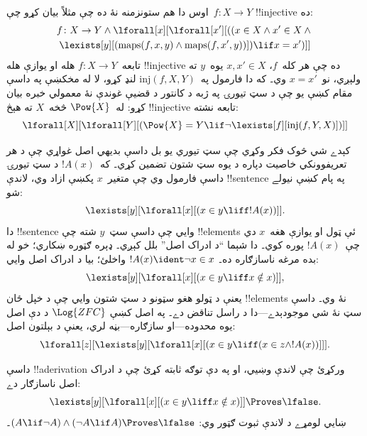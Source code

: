 \documentclass[../../../include/open-logic-section]{subfiles}
\begin{document}
اوس دا هم ستونزمنه نۀ ده چې مثلاً بيان کړو چې~$f\colon X \to Y$
!!{injective} ده:
\begin{multline*}
 f \colon X \to Y \land \lforall[x][\lforall[x'][((x \in X \land x' \in
     X \land {} \\
 \lexists[y][(\mathrm{maps}(f, x, y) \land \mathrm{maps}(f,
        x', y))]) \lif x = x')]]
\end{multline*}
تابعه~$f\colon X \to Y$ هله او يوازې هله !!{injective} ده چې هر
کله~$f$، $x, x' \in X$ يوه~$y$ ته ولېږي، نو~$x = x'$ وي۔ که دا
فارمول په~$\mathrm{inj}(f, X, Y)$ لنډ کړو، لا له مخکښې په داسې مقام
کښې يو چې د سټ تيورۍ په ژبه د کانتور د قضيې غوندې نۀ معمولي خبره
بيان کړو: له~$\Pow{X}$ څخه~$X$ ته هېڅ !!{injective} تابعه نشته:
\[
\lforall[X][\lforall[Y][(\Pow{X} = Y \lif
    \lnot\lexists[f][\mathrm{inj}(f, Y, X)])]]
\]

کېدے شي څوک فکر وکړي چې سټ تيوري يو بل داسې بديهي اصل غواړي چې د هر
تعريفوونکي خاصيت دپاره د يوه سټ شتون تضمين کړي۔ که~$!A(x)$ د سټ
تيورۍ داسې فارمول وي چې متغير~$x$ پکښې ازاد وي، لاندې !!{sentence}
په پام کښې نيولے شو:
\[
\lexists[y][\lforall[x][(x \in y \liff !A(x))]].
\]
دا !!{sentence} وايي چې داسې سټ~$y$ شته چې !!{element}s ئې ټول او
يوازې هغه~$x$ دي چې~$!A(x)$ پوره کوي۔ دا شېما ``د ادراک اصل'' بلل
کېږي۔ ډېره ګټوره ښکاري؛ خو له بده مرغه ناسازګاره ده۔
$!A(x) \ident \lnot x \in x$ واخلئ؛ بيا د ادراک اصل وايي:
\[
\lexists[y][\lforall[x][(x \in y \liff x \notin x)]],
\]
يعنې د ټولو هغو سټونو د سټ شتون وايي چې د خپل ځان !!{element}s نۀ
وي۔ داسې سټ نۀ شي موجودېدے---دا د راسل تناقض دے۔ په اصل کښې
$\Log{ZFC}$ د دې اصل يوه محدوده---او سازګاره---بڼه لري، يعنې د
بېلتون اصل:
\[
\lforall[z][\lexists[y][\lforall[x][(x \in y \liff (x \in z \land
      !A(x))]]].
\]

\begin{prob}
داسې !!a{derivation} ورکړئ چې لاندې وښيي، او په دې توګه ثابته کړئ
چې د ادراک اصل ناسازګار دے:
\[
\lexists[y][\lforall[x][(x \in y \liff x \notin x)]] \Proves \lfalse.
\]
ښايي لومړے د لاندې ثبوت ګټور وي:
$(A \lif \lnot A) \land (\lnot A \lif A) \Proves \lfalse$۔
\end{prob}
\end{document}
